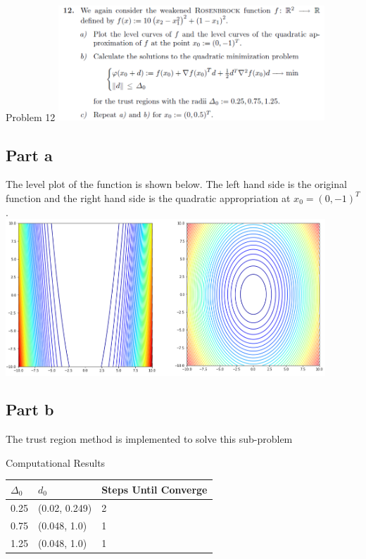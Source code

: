 \documentclass[10pt]{article}
\begin{document}
\begin{section}{Problem 12}
\includegraphics[width=10cm]{img/problem12.png}

\subsection{Part a}
The level plot of the function is shown below. The left hand side is the original function and the right hand side is the quadratic appropriation at $x_0 = (0, -1)^T$. \\

\includegraphics[width=12cm]{img/problem12_plt1.png}


\subsection{Part b}
The trust region method is implemented to solve this sub-problem


Computational Results 


\begin{tabular}{lll}
	\hline
	$\Delta_0$ & $d_0$ & Steps Until Converge \\
	\hline\hline
	0.25 & (0.02, 0.249) & 2 \\
	0.75 & (0.048, 1.0)  & 1 \\
	1.25 & (0.048, 1.0)  & 1
\end{tabular}


\end{section}
\end{document}
